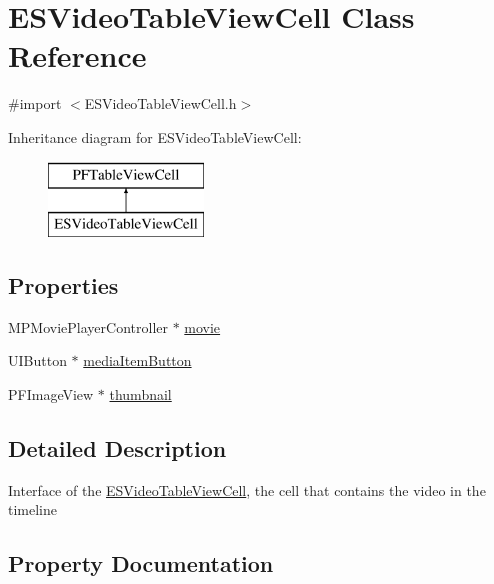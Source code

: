 \hypertarget{interface_e_s_video_table_view_cell}{}\section{E\+S\+Video\+Table\+View\+Cell Class Reference}
\label{interface_e_s_video_table_view_cell}


{\ttfamily \#import $<$E\+S\+Video\+Table\+View\+Cell.\+h$>$}

Inheritance diagram for E\+S\+Video\+Table\+View\+Cell\+:\begin{figure}[H]
\begin{center}
\leavevmode
\includegraphics[height=2.000000cm]{interface_e_s_video_table_view_cell}
\end{center}
\end{figure}
\subsection*{Properties}
\begin{DoxyCompactItemize}
\item 
M\+P\+Movie\+Player\+Controller $\ast$ \hyperlink{interface_e_s_video_table_view_cell_a24eb7e1fb1973ff5fed8dd0b7e6bc5a1}{movie}
\item 
U\+I\+Button $\ast$ \hyperlink{interface_e_s_video_table_view_cell_a9d576f3f1ad5d975e2b82fc09f75fd12}{media\+Item\+Button}
\item 
P\+F\+Image\+View $\ast$ \hyperlink{interface_e_s_video_table_view_cell_ada77b7a35791b50d7e01070a0d86042a}{thumbnail}
\end{DoxyCompactItemize}


\subsection{Detailed Description}
Interface of the \hyperlink{interface_e_s_video_table_view_cell}{E\+S\+Video\+Table\+View\+Cell}, the cell that contains the video in the timeline 

\subsection{Property Documentation}
\hypertarget{interface_e_s_video_table_view_cell_a9d576f3f1ad5d975e2b82fc09f75fd12}{}
